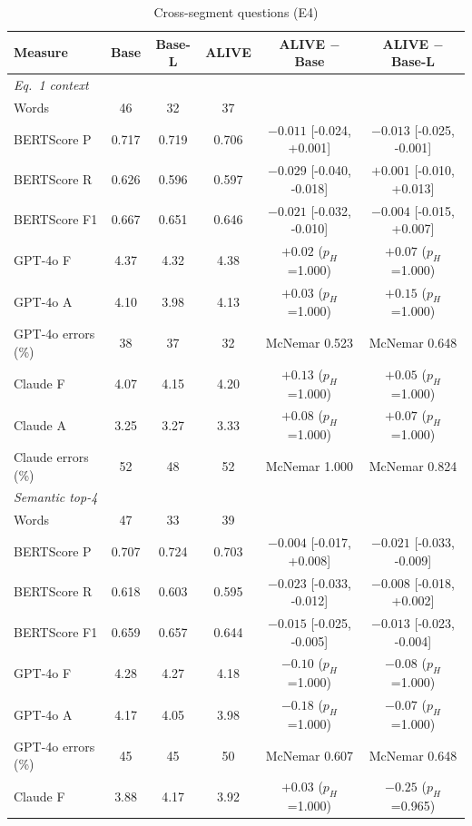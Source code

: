 \begin{table}[!htbp]
\centering
\caption{Cross-segment questions (E4)}
\label{tab:sup_e4}
\small
\begin{tabular}{lccccc}
\toprule
\textbf{Measure} & \textbf{Base} & \textbf{Base-L} & \textbf{ALIVE} & \textbf{ALIVE $-$ Base} & \textbf{ALIVE $-$ Base-L} \\
\midrule
\multicolumn{6}{l}{\textit{Eq.~1 context}} \\
Words & 46 & 32 & 37 & & \\
BERTScore P & 0.717 & 0.719 & 0.706 & $-0.011$ [-0.024, +0.001] & $-0.013$ [-0.025, -0.001] \\
BERTScore R & 0.626 & 0.596 & 0.597 & $-0.029$ [-0.040, -0.018] & $+0.001$ [-0.010, +0.013] \\
BERTScore F1 & 0.667 & 0.651 & 0.646 & $-0.021$ [-0.032, -0.010] & $-0.004$ [-0.015, +0.007] \\
GPT-4o F & 4.37 & 4.32 & 4.38 & $+0.02$ ($p_H$=1.000) & $+0.07$ ($p_H$=1.000) \\
GPT-4o A & 4.10 & 3.98 & 4.13 & $+0.03$ ($p_H$=1.000) & $+0.15$ ($p_H$=1.000) \\
GPT-4o errors (\%) & 38 & 37 & 32 & McNemar 0.523 & McNemar 0.648 \\
Claude F & 4.07 & 4.15 & 4.20 & $+0.13$ ($p_H$=1.000) & $+0.05$ ($p_H$=1.000) \\
Claude A & 3.25 & 3.27 & 3.33 & $+0.08$ ($p_H$=1.000) & $+0.07$ ($p_H$=1.000) \\
Claude errors (\%) & 52 & 48 & 52 & McNemar 1.000 & McNemar 0.824 \\
\multicolumn{6}{l}{\textit{Semantic top-4}} \\
Words & 47 & 33 & 39 & & \\
BERTScore P & 0.707 & 0.724 & 0.703 & $-0.004$ [-0.017, +0.008] & $-0.021$ [-0.033, -0.009] \\
BERTScore R & 0.618 & 0.603 & 0.595 & $-0.023$ [-0.033, -0.012] & $-0.008$ [-0.018, +0.002] \\
BERTScore F1 & 0.659 & 0.657 & 0.644 & $-0.015$ [-0.025, -0.005] & $-0.013$ [-0.023, -0.004] \\
GPT-4o F & 4.28 & 4.27 & 4.18 & $-0.10$ ($p_H$=1.000) & $-0.08$ ($p_H$=1.000) \\
GPT-4o A & 4.17 & 4.05 & 3.98 & $-0.18$ ($p_H$=1.000) & $-0.07$ ($p_H$=1.000) \\
GPT-4o errors (\%) & 45 & 45 & 50 & McNemar 0.607 & McNemar 0.648 \\
Claude F & 3.88 & 4.17 & 3.92 & $+0.03$ ($p_H$=1.000) & $-0.25$ ($p_H$=0.965) \\

\end{tabular}
\end{table}
